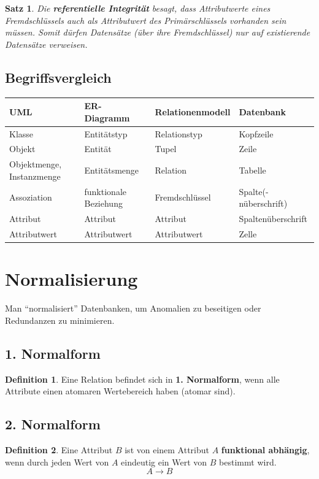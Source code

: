 \documentclass[a4paper,10pt,DIV9, BCOR12mm, oneside,openright,openbib]{scrreprt}
\theoremstyle{definition}
\newtheorem{mydef}{Definition}[section]
\theoremstyle{plain}
\newtheorem{mysat}{Satz}[section]
\begin{document}
\begin{mysat}
 Die \textbf{referentielle Integrität} besagt, dass Attributwerte eines Fremdschlüssels auch als Attributwert des Primärschlüssels vorhanden sein müssen. Somit dürfen Datensätze (über ihre \textit{Fremdschlüssel}) nur auf existierende Datensätze verweisen.
\end{mysat}


 \subsection{Begriffsvergleich}
\begin{center}
\begin{tabularx}{\columnwidth}{|X|X|X|X|} \hline 
\textbf{UML} & \textbf{ER-Diagramm} & \textbf{Relationenmodell} & \textbf{Datenbank}\\ \hline \hline
Klasse & Entitätstyp & Relationstyp & Kopfzeile\\ \hline
Objekt & Entität & Tupel & Zeile\\ \hline
Objektmenge, Instanzmenge & Entitätsmenge & Relation & Tabelle\\ \hline
Assoziation & funktionale Beziehung & Fremdschlüssel & Spalte(-nüberschrift)\\ \hline
Attribut & Attribut & Attribut & Spaltenüberschrift\\ \hline 
Attributwert & Attributwert & Attributwert & Zelle \\ \hline
\end{tabularx}
\end{center}


 \section{Normalisierung}
 Man ``normalisiert'' Datenbanken, um Anomalien zu beseitigen oder Redundanzen zu minimieren.
 \subsection{1. Normalform}
  \begin{mydef}
   Eine Relation befindet sich in \textbf{1. Normalform}, wenn alle Attribute einen atomaren Wertebereich haben (atomar sind).
  \end{mydef}
  
 \subsection{2. Normalform}
  \begin{mydef}
   Eine Attribut $B$ ist von einem Attribut $A$ \textbf{funktional abhängig}, wenn durch jeden Wert von $A$ eindeutig ein Wert von $B$ bestimmt wird. \[ A \rightarrow B \]
  \end{mydef}
  
\end{document}

